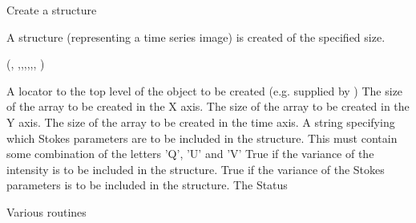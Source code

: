 \begin{manroutinedescription}
     Create a {} {} structure

     A {} {} structure (representing a time series image) %
is
     created of the specified size.

     {}

     {} {} ({},{%
},{},{},{},{},{},{%
})

\begin{manparametertable}
 A locator %
to the
                       top level of the object to
                       be created (e.g. supplied by {})
 The size of the %
array to be created
                       in the X axis.
 The size of the %
array to be created
                       in the Y axis.
 The size of the %
array to be created
                       in the time axis.
 A string %
specifying which
                       Stokes parameters are to be included in the
                       structure. This must contain some combination
                       of the letters 'Q', 'U' and 'V'
 True if the %
variance of the intensity
                       is to be included in the structure.
 True if the %
variance of the Stokes
                       parameters is to be included in the structure.
 The Status

\end{manparametertable}
     Various {} routines
\end{manroutinedescription}
